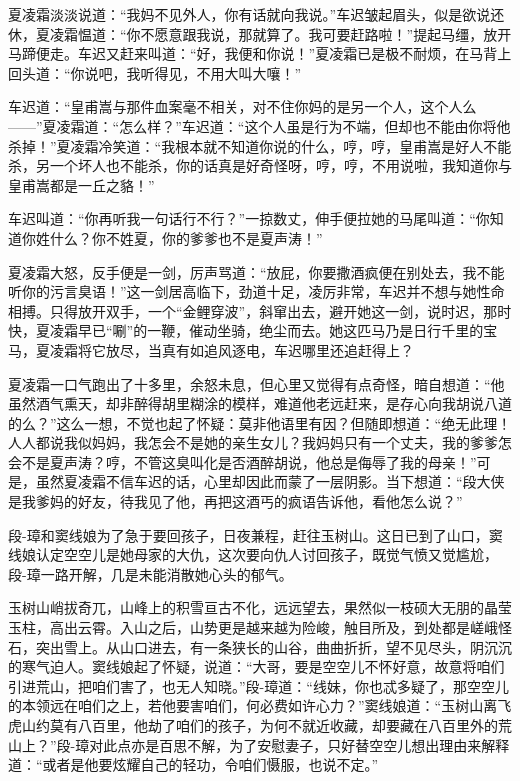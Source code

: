 \documentclass[12pt,oneside]{book}
\begin{document}
夏凌霜淡淡说道：``我妈不见外人，你有话就向我说。''车迟皱起眉头，似是欲说还休，夏凌霜愠道：``你不愿意跟我说，那就算了。我可要赶路啦！''提起马缰，放开马蹄便走。车迟又赶来叫道：``好，我便和你说！''夏凌霜已是极不耐烦，在马背上回头道：``你说吧，我听得见，不用大叫大嚷！''

车迟道：``皇甫嵩与那件血案毫不相关，对不住你妈的是另一个人，这个人么------''夏凌霜道：``怎么样？''车迟道：``这个人虽是行为不端，但却也不能由你将他杀掉！''夏凌霜冷笑道：``我根本就不知道你说的什么，哼，哼，皇甫嵩是好人不能杀，另一个坏人也不能杀，你的话真是好奇怪呀，哼，哼，不用说啦，我知道你与皇甫嵩都是一丘之貉！''

车迟叫道：``你再听我一句话行不行？''一掠数丈，伸手便拉她的马尾叫道：``你知道你姓什么？你不姓夏，你的爹爹也不是夏声涛！''

夏凌霜大怒，反手便是一剑，厉声骂道：``放屁，你要撒酒疯便在别处去，我不能听你的污言臭语！''这一剑居高临下，劲道十足，凌厉非常，车迟并不想与她性命相搏。只得放开双手，一个``金鲤穿波''，斜窜出去，避开她这一剑，说时迟，那时快，夏凌霜早已``唰''的一鞭，催动坐骑，绝尘而去。她这匹马乃是日行千里的宝马，夏凌霜将它放尽，当真有如追风逐电，车迟哪里还追赶得上？

夏凌霜一口气跑出了十多里，余怒未息，但心里又觉得有点奇怪，暗自想道：``他虽然酒气熏天，却非醉得胡里糊涂的模样，难道他老远赶来，是存心向我胡说八道的么？''这么一想，不觉也起了怀疑：莫非他语里有因？但随即想道：``绝无此理！人人都说我似妈妈，我怎会不是她的亲生女儿？我妈妈只有一个丈夫，我的爹爹怎会不是夏声涛？哼，不管这臭叫化是否酒醉胡说，他总是侮辱了我的母亲！''可是，虽然夏凌霜不信车迟的话，心里却因此而蒙了一层阴影。当下想道：``段大侠是我爹妈的好友，待我见了他，再把这酒丐的疯语告诉他，看他怎么说？''

段-璋和窦线娘为了急于要回孩子，日夜兼程，赶往玉树山。这日已到了山口，窦线娘认定空空儿是她母家的大仇，这次要向仇人讨回孩子，既觉气愤又觉尴尬，段-璋一路开解，几是未能消散她心头的郁气。

玉树山峭拔奇兀，山峰上的积雪亘古不化，远远望去，果然似一枝硕大无朋的晶莹玉柱，高出云霄。入山之后，山势更是越来越为险峻，触目所及，到处都是嵯峨怪石，突出雪上。从山口进去，有一条狭长的山谷，曲曲折折，望不见尽头，阴沉沉的寒气迫人。窦线娘起了怀疑，说道：``大哥，要是空空儿不怀好意，故意将咱们引进荒山，把咱们害了，也无人知晓。''段-璋道：``线妹，你也忒多疑了，那空空儿的本领远在咱们之上，若他要害咱们，何必费如许心力？''窦线娘道：``玉树山离飞虎山约莫有八百里，他劫了咱们的孩子，为何不就近收藏，却要藏在八百里外的荒山上？''段-璋对此点亦是百思不解，为了安慰妻子，只好替空空儿想出理由来解释道：``或者是他要炫耀自己的轻功，令咱们慑服，也说不定。''
\end{document}
